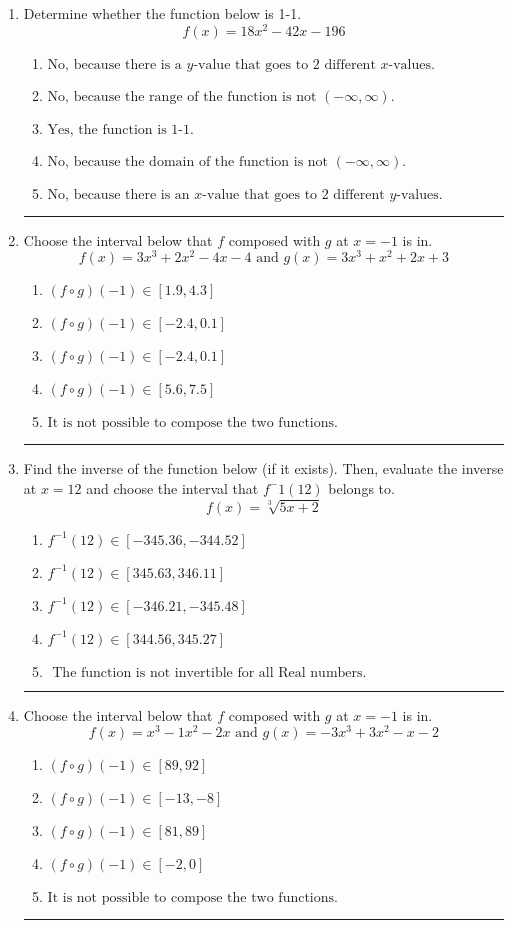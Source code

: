 \documentclass[14pt]{extbook}
\newcommand{\litem}[1]{\item#1\hspace*{-1cm}\rule{\textwidth}{0.4pt}}
\begin{document}
\begin{enumerate}
{\begin{enumerate}[label=\Alph*.]
\end{enumerate} }
\litem{
Determine whether the function below is 1-1.\[ f(x) = 18 x^2 - 42 x - 196 \]\begin{enumerate}[label=\Alph*.]
\item \( \text{No, because there is a $y$-value that goes to 2 different $x$-values.} \)
\item \( \text{No, because the range of the function is not $(-\infty, \infty)$.} \)
\item \( \text{Yes, the function is 1-1.} \)
\item \( \text{No, because the domain of the function is not $(-\infty, \infty)$.} \)
\item \( \text{No, because there is an $x$-value that goes to 2 different $y$-values.} \)

\end{enumerate} }
\litem{
Choose the interval below that $f$ composed with $g$ at $x=-1$ is in.\[ f(x) = 3x^{3} +2 x^{2} -4 x -4 \text{ and } g(x) = 3x^{3} + x^{2} +2 x + 3 \]\begin{enumerate}[label=\Alph*.]
\item \( (f \circ g)(-1) \in [1.9, 4.3] \)
\item \( (f \circ g)(-1) \in [-2.4, 0.1] \)
\item \( (f \circ g)(-1) \in [-2.4, 0.1] \)
\item \( (f \circ g)(-1) \in [5.6, 7.5] \)
\item \( \text{It is not possible to compose the two functions.} \)

\end{enumerate} }
\litem{
Find the inverse of the function below (if it exists). Then, evaluate the inverse at $x = 12$ and choose the interval that $f^-1(12)$ belongs to.\[ f(x) = \sqrt[3]{5 x + 2} \]\begin{enumerate}[label=\Alph*.]
\item \( f^{-1}(12) \in [-345.36, -344.52] \)
\item \( f^{-1}(12) \in [345.63, 346.11] \)
\item \( f^{-1}(12) \in [-346.21, -345.48] \)
\item \( f^{-1}(12) \in [344.56, 345.27] \)
\item \( \text{ The function is not invertible for all Real numbers. } \)

\end{enumerate} }
\litem{
Choose the interval below that $f$ composed with $g$ at $x=-1$ is in.\[ f(x) = x^{3} -1 x^{2} -2 x \text{ and } g(x) = -3x^{3} +3 x^{2} -x -2 \]\begin{enumerate}[label=\Alph*.]
\item \( (f \circ g)(-1) \in [89, 92] \)
\item \( (f \circ g)(-1) \in [-13, -8] \)
\item \( (f \circ g)(-1) \in [81, 89] \)
\item \( (f \circ g)(-1) \in [-2, 0] \)
\item \( \text{It is not possible to compose the two functions.} \)


\end{enumerate}}
\end{enumerate}
\end{document}
